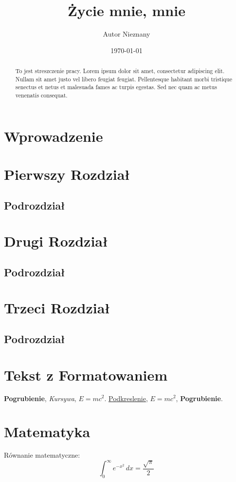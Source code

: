 \documentclass{article}
\title{Życie mnie, mnie}
\author{Autor Nieznany}
\date{\today}
\begin{document}
\maketitle

\begin{abstract}
    To jest streszczenie pracy. Lorem ipsum dolor sit amet, consectetur adipiscing elit. Nullam sit amet justo vel libero feugiat feugiat. Pellentesque habitant morbi tristique senectus et netus et malesuada fames ac turpis egestas. Sed nec quam ac metus venenatis consequat.
\end{abstract}

\tableofcontents

\section{Wprowadzenie}
\lipsum[1]

\section{Pierwszy Rozdział}
\subsection{Podrozdział}
\lipsum[2-4]

\section{Drugi Rozdział}
\subsection{Podrozdział}
\lipsum[5-7]

\section{Trzeci Rozdział}
\subsection{Podrozdział}
\lipsum[8-15]

\section{Tekst z Formatowaniem}
\textbf{Pogrubienie}, \emph{Kursywa}, $E=mc^2$.
\underline{Podkreslenie}, $E=mc^2$, \textbf{Pogrubienie}.

\section{Matematyka}
Równanie matematyczne:
\begin{equation}
    \int_{0}^{\infty} e^{-x^2} \, dx = \frac{\sqrt{\pi}}{2}
\end{equation}
\end{document}

